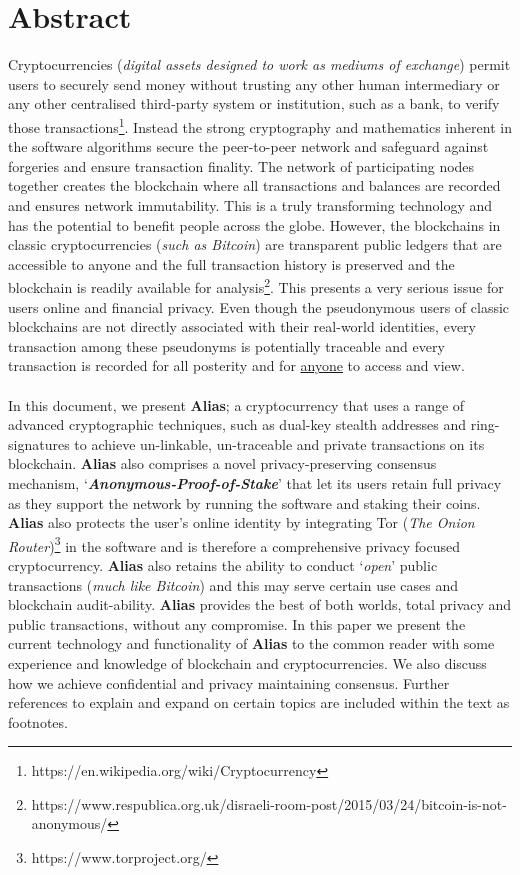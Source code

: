 \section{Abstract}
Cryptocurrencies (\textit{digital assets designed to work as mediums of exchange})
permit users to securely send money without trusting any other human intermediary
or any other centralised third-party system or institution, such as a bank, to
verify those transactions\footnote{https://en.wikipedia.org/wiki/Cryptocurrency}.
Instead the strong cryptography and mathematics inherent in the software
algorithms secure the peer-to-peer network and safeguard against forgeries and
ensure transaction finality. The network of participating nodes together
creates the blockchain where all transactions and balances are recorded and
ensures network immutability. This is a truly transforming technology and has
the potential to benefit people across the globe. However, the blockchains in
classic cryptocurrencies (\textit{such as Bitcoin}) are transparent public
ledgers that are accessible to anyone and the full transaction history is
preserved and the blockchain is readily available for analysis\footnote{https://www.respublica.org.uk/disraeli-room-post/2015/03/24/bitcoin-is-not-anonymous/}. 
This presents a very serious issue for users online and financial privacy.
Even though the pseudonymous users of classic blockchains are not directly
associated with their real-world identities, every transaction among these
pseudonyms is potentially traceable and every transaction is recorded for
all posterity and for \underline{anyone} to access and view.
\\
\\
In this document, we present \textbf{Alias}; a cryptocurrency that
uses a range of advanced cryptographic techniques, such as dual-key stealth
addresses and ring-signatures to achieve un-linkable, un-traceable and 
private transactions on its blockchain. \textbf{Alias}
also comprises a novel privacy-preserving consensus mechanism,
‘\textbf{\textit{Anonymous-Proof-of-Stake}}’ that let its users retain
full privacy as they support the network by running the software and
staking their coins. \textbf{Alias} also protects the user’s online
identity by integrating Tor (\textit{The Onion Router})\footnote{https://www.torproject.org/} 
in the software and is therefore a
comprehensive privacy focused cryptocurrency. \textbf{Alias} also
retains the ability to conduct ‘\textit{open}’ public transactions
(\textit{much like Bitcoin}) and this may serve certain use cases and
blockchain audit-ability. \textbf{Alias} provides the best of both
worlds, total privacy and public transactions, without any compromise.
In this paper we present the current technology and functionality of
\textbf{Alias} to the common reader with some experience and knowledge
of blockchain and cryptocurrencies. We also discuss how we achieve
confidential and privacy maintaining consensus. Further references
to explain and expand on certain topics are included within the text as
footnotes.
